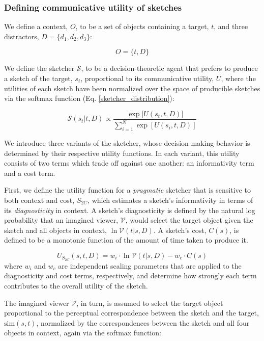\documentclass[9pt,twocolumn,twoside]{pnas-new}
\begin{document}
\subsubsection*{Defining communicative utility of sketches}

We define a context, $O$, to be a set of objects containing a target, $t$, and three distractors, $D=\{d_1,d_2,d_3\}$:

\begin{equation} \label{object set}
O = \{t,D\}
\end{equation}

We define the sketcher $\mathcal{S}$, to be a decision-theoretic agent that prefers to produce a sketch of the target, $s_t$, proportional to its communicative utility, $U$, where the utilities of each sketch have been normalized over the space of producible sketches via the softmax function (Eq. \ref{sketcher_distribution}):

\begin{equation} \label{sketcher_distribution}
\mathcal{S}(s_t|t, D) \propto \frac {\exp [{U(s_t,t,D)]}} {\sum_{i=1}^{N} {\exp [U(s_i,t,D)]}}
\end{equation}

We introduce three variants of the sketcher, whose decision-making behavior is determined by their respective utility functions. 
In each variant, this utility consists of two terms which trade off against one another: an informativity term and a cost term. 

First, we define the utility function for a \textit{pragmatic} sketcher that is sensitive to both context and cost, $S_{2C}$, which estimates a sketch's informativity in terms of its \textit{diagnosticity} in context. 
A sketch's diagnosticity is defined by the natural log probability that an imagined viewer, $\mathcal{V}$, would select the target object given the sketch and all objects in context, $\ln \mathcal{V}(t|s,D)$. 
A sketch's cost, $C(s)$, is defined to be a monotonic function of the amount of time taken to produce it. 

\begin{equation} \label{sketcher_utility}
U_{S_{2C}}(s,t,D) = w_i \cdot \ln \mathcal{V}(t|s,D) - w_c \cdot  C(s)
\end{equation}
where $w_i$ and $w_c$ are independent scaling parameters that are applied to the diagnosticity and cost terms, respectively, and determine how strongly each term contributes to the overall utility of the sketch. 

The imagined viewer $\mathcal{V}$, in turn, is assumed to select the target object proportional to the perceptual correspondence between the sketch and the target, $\textrm{sim}(s,t)$, normalized by the correspondences between the sketch and all four objects in context, again via the softmax function:
\end{document}

